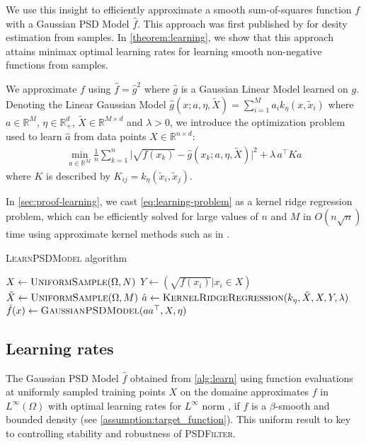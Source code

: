 We use this insight to efficiently approximate a smooth sum-of-squares function $f$ with a Gaussian PSD Model $\hat f$. This approach was first published by \cite{sampling-ulysse} for desity estimation from samples. In \cref{theorem:learning}, we show that this approach attains minimax optimal learning rates for learning smooth non-negative functions from samples.

We approximate $f$ using $\hat f= \hat g^2$ where $\hat g$ is a Gaussian Linear Model learned on $g$. Denoting the Linear Gaussian Model $\hat g(x ; a, \eta, \tilde X) = \sum_{i=1}^M a_ik_\eta(x, \tilde x_i)$ where $a\in\mathbb R^M$, $\eta \in \mathbb R_+^d$, $\tilde X \in \mathbb R^{M\times d}$ and $\lambda > 0$, we introduce the optimization problem used to learn $\hat a$ from data points $X\in\mathbb R^{n\times d}$:
\begin{align}\label{eq:learning-problem}
\min_{a \in\mathbb R^M} \frac{1}{n}\sum_{k=1}^n \vert \sqrt{f(x_k)} - \hat g(x_k ; a, \eta, \tilde X)\vert^2+ \lambda \, a^\top Ka
\end{align}
where $K$ is described by $K_{ij}=k_\eta(\tilde x_i, \tilde x_j)$.

In \cref{sec:proof-learning}, we cast \cref{eq:learning-problem} as a kernel ridge regression problem, which can be efficiently solved for large values of $n$ and $M$ in $O(n\sqrt{n})$ time using approximate kernel methods such as in \cite{falkon}.

\begin{algorithm}[ht!]
\caption{\textsc{LearnPSDModel} algorithm}\label{alg:learn}
{}
$X \gets \textsc{UniformSample}(\Omega, N)$  \BlankLine
$Y \gets (\sqrt{f(x_i)} \vert x_i \in X)$\;\BlankLine
$\tilde X\gets \textsc{UniformSample}(\Omega, M)$\;  \BlankLine
$\hat a \gets \textsc{KernelRidgeRegression}(k_\eta, \tilde X, X, Y, \lambda)$ \;  \BlankLine
$\hat f(x) \gets \textsc{GaussianPSDModel}(aa^\top , X, \eta)$\;\BlankLine
{}
\end{algorithm}

\subsection{Learning rates}\label{sec:learning}
The Gaussian PSD Model $\hat f$ obtained from \cref{alg:learn} using function evaluations at uniformly sampled training points $X$ on the domaine approximates $f$ in $L^\infty(\Omega)$ with optimal learning rates for $L^\infty$ norm \citep{wendland2004scattered}, if $f$ is a $\beta$-smooth and bounded density (see \cref{assumption:target_function}). This uniform result to key to controlling stability and robustness of \textsc{PSDFilter}.

